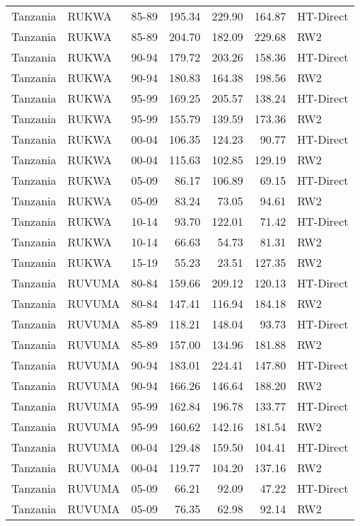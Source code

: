 \begin{longtable}{lllrrrl}
  Tanzania & RUKWA & 85-89 & 195.34 & 229.90 & 164.87 & HT-Direct \\ 
  Tanzania & RUKWA & 85-89 & 204.70 & 182.09 & 229.68 & RW2 \\ 
  Tanzania & RUKWA & 90-94 & 179.72 & 203.26 & 158.36 & HT-Direct \\ 
  Tanzania & RUKWA & 90-94 & 180.83 & 164.38 & 198.56 & RW2 \\ 
  Tanzania & RUKWA & 95-99 & 169.25 & 205.57 & 138.24 & HT-Direct \\ 
  Tanzania & RUKWA & 95-99 & 155.79 & 139.59 & 173.36 & RW2 \\ 
  Tanzania & RUKWA & 00-04 & 106.35 & 124.23 & 90.77 & HT-Direct \\ 
  Tanzania & RUKWA & 00-04 & 115.63 & 102.85 & 129.19 & RW2 \\ 
  Tanzania & RUKWA & 05-09 & 86.17 & 106.89 & 69.15 & HT-Direct \\ 
  Tanzania & RUKWA & 05-09 & 83.24 & 73.05 & 94.61 & RW2 \\ 
  Tanzania & RUKWA & 10-14 & 93.70 & 122.01 & 71.42 & HT-Direct \\ 
  Tanzania & RUKWA & 10-14 & 66.63 & 54.73 & 81.31 & RW2 \\ 
  Tanzania & RUKWA & 15-19 & 55.23 & 23.51 & 127.35 & RW2 \\ 
  Tanzania & RUVUMA & 80-84 & 159.66 & 209.12 & 120.13 & HT-Direct \\ 
  Tanzania & RUVUMA & 80-84 & 147.41 & 116.94 & 184.18 & RW2 \\ 
  Tanzania & RUVUMA & 85-89 & 118.21 & 148.04 & 93.73 & HT-Direct \\ 
  Tanzania & RUVUMA & 85-89 & 157.00 & 134.96 & 181.88 & RW2 \\ 
  Tanzania & RUVUMA & 90-94 & 183.01 & 224.41 & 147.80 & HT-Direct \\ 
  Tanzania & RUVUMA & 90-94 & 166.26 & 146.64 & 188.20 & RW2 \\ 
  Tanzania & RUVUMA & 95-99 & 162.84 & 196.78 & 133.77 & HT-Direct \\ 
  Tanzania & RUVUMA & 95-99 & 160.62 & 142.16 & 181.54 & RW2 \\ 
  Tanzania & RUVUMA & 00-04 & 129.48 & 159.50 & 104.41 & HT-Direct \\ 
  Tanzania & RUVUMA & 00-04 & 119.77 & 104.20 & 137.16 & RW2 \\ 
  Tanzania & RUVUMA & 05-09 & 66.21 & 92.09 & 47.22 & HT-Direct \\ 
  Tanzania & RUVUMA & 05-09 & 76.35 & 62.98 & 92.14 & RW2 \\ 

\end{longtable}
